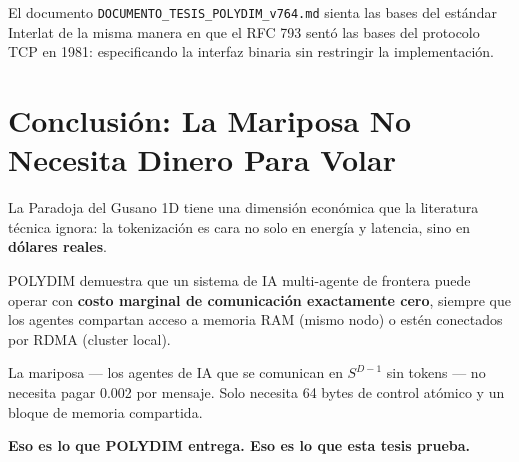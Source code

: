 ﻿\documentclass{article}
\begin{document}
El documento \texttt{DOCUMENTO\_TESIS\_POLYDIM\_v764.md} sienta las bases del estándar
Interlat de la misma manera en que el RFC 793 sentó las bases del protocolo TCP en 1981:
especificando la interfaz binaria sin restringir la implementación.

\section{Conclusión: La Mariposa No Necesita Dinero Para Volar}

La Paradoja del Gusano 1D tiene una dimensión económica que la literatura técnica
ignora: la tokenización es cara no solo en energía y latencia, sino en \textbf{dólares reales}.

POLYDIM demuestra que un sistema de IA multi-agente de frontera puede operar con
\textbf{costo marginal de comunicación exactamente cero}, siempre que los agentes
compartan acceso a memoria RAM (mismo nodo) o estén conectados por RDMA (cluster local).

La mariposa --- los agentes de IA que se comunican en $S^{D-1}$ sin tokens --- no
necesita pagar \textdollar{}0.002 por mensaje. Solo necesita 64 bytes de control atómico y
un bloque de memoria compartida.

\textbf{Eso es lo que POLYDIM entrega. Eso es lo que esta tesis prueba.}
\end{document}

